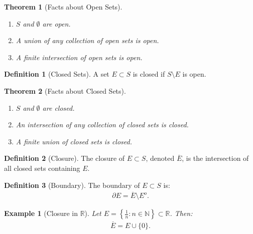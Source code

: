 \documentclass[7pt]{article}
\theoremstyle{definition}
\newtheorem{definition}{Definition}
\theoremstyle{plain}
\newtheorem{theorem}{Theorem}
\newtheorem{example}{Example}
\begin{document}
\begin{theorem}[Facts about Open Sets]

\begin{enumerate}
    \item $ S $ and $ \emptyset $ are open.
    \item A union of any collection of open sets is open.
    \item A finite intersection of open sets is open.
\end{enumerate}
\end{theorem}

\begin{definition}[Closed Sets]
A set $ E \subset S $ is closed if $ S \setminus E $ is open.
\end{definition}

\begin{theorem}[Facts about Closed Sets]

\begin{enumerate}
    \item $ S $ and $ \emptyset $ are closed.
    \item An intersection of any collection of closed sets is closed.
    \item A finite union of closed sets is closed.
\end{enumerate}
\end{theorem}

\begin{definition}[Closure]
The closure of $ E \subset S $, denoted $ \overline{E} $, is the intersection of all closed sets containing $ E $.
\end{definition}

\begin{definition}[Boundary]
The boundary of $ E \subset S $ is:
\begin{align}
\partial E = \overline{E} \setminus E^o.
\end{align}
\end{definition}

\begin{example}[Closure in $ \mathbb{R} $]
Let $ E = \left\{\frac{1}{n} : n \in \mathbb{N}\right\} \subset \mathbb{R} $. Then:
\begin{align}
\overline{E} = E \cup \{0\}.
\end{align}
\end{example}
\end{document}
